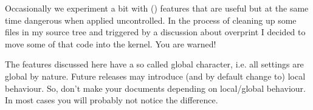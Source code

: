 
%
%


\setupcolors[rgb=no,cmyk=yes]

\definecolor[red]      [c=.25,m=.75,y=.75,k=.25]
\definecolor[green]    [c=.75,m=.25,y=.75,k=.25]
\definecolor[blue]     [c=.75,m=.75,y=.25,k=.25]

\definecolor[tred]     [c=.25,m=.75,y=.75,k=.25,t=.5,a=1]
\definecolor[tgreen]   [c=.75,m=.25,y=.75,k=.25,t=.5,a=1]
\definecolor[tblue]    [c=.75,m=.75,y=.25,k=.25,t=.5,a=1]
\definecolor[tblack]   [s=0,t=.75,a=1]

\definecolor[ocyan]    [c=.75]
\definecolor[omagenta] [m=.75]
\definecolor[oyellow]  [y=.75]
\definecolor[ogray]    [s=.5]

\startbuffer[abstract]
    Occasionally we experiment a bit with (\PDF) features that are useful but at
    the same time dangerous when applied uncontrolled. In the process of cleaning
    up some files in my source tree and triggered by a discussion about overprint
    I decided to move some of that code into the kernel. You are warned!
\stopbuffer


\startdocument
  [title={A Few Dangerous Features},
   author=Hans Hagen,
   affiliation=PRAGMA ADE,
   date=June 2004,
   number=6 \MKIV]

\subject{Remark}

The features discussed here have a so called global character, i.e. all settings
are global by nature. Future releases may introduce (and by default change to)
local behaviour. So, don't make your documents depending on local/global
behaviour. In most cases you will probably not notice the difference.


